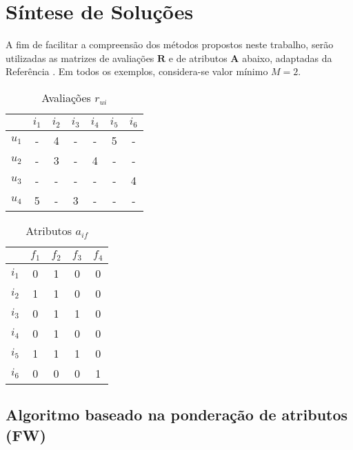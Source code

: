 \chapter[Síntese de Soluções]{Síntese de Soluções}
\label{chap:sintese_de_solucoes}

A fim de facilitar a compreensão dos métodos propostos neste trabalho, serão utilizadas as matrizes de avaliações $\mathbf{R}$ e de atributos $\mathbf{A}$ abaixo, adaptadas da Referência . Em todos os exemplos, considera-se valor mínimo $M=2$.

\begin{table}[h]
\begin{center}
    \caption{Avaliações $r_{ui}$}
    \begin{tabular}{ | c | c | c | c | c | c | c | } 
    \hline
     & $i_1$ & $i_2$ & $i_3$ & $i_4$ & $i_5$ & $i_6$ \\ \hline
     $u_1$ & - & 4 & - & - & 5 & - \\ \hline
     $u_2$ & - & 3 & - & 4 & - & - \\ \hline
     $u_3$ & - & - & - & - & - & 4 \\ \hline
     $u_4$ & 5 & - & 3 & - & - & - \\ \hline
    \end{tabular}
\end{center}
\end{table}

\begin{table}[h]
\begin{center}
    \caption{Atributos $a_{if}$}
    \begin{tabular}{ | c | c | c | c | c | } 
    \hline
     & $f_1$ & $f_2$ & $f_3$ & $f_4$  \\ \hline
     $i_1$ & 0 & 1 & 0 & 0  \\ \hline
     $i_2$ & 1 & 1 & 0 & 0  \\ \hline
     $i_3$ & 0 & 1 & 1 & 0  \\ \hline
     $i_4$ & 0 & 1 & 0 & 0  \\ \hline
     $i_5$ & 1 & 1 & 1 & 0  \\ \hline
     $i_6$ & 0 & 0 & 0 & 1  \\ \hline
    \end{tabular}
\end{center}
\end{table}

\section{Algoritmo baseado na ponderação de atributos (FW)} %
\label{sec:algoritmo_baseado_na_pondera_o_de_atributos_}

